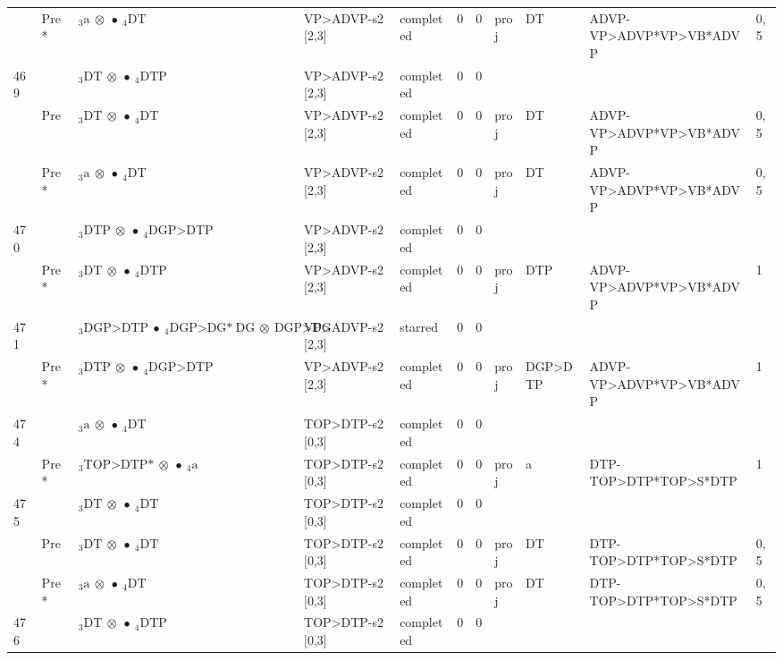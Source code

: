\documentclass[10pt]{article}
\begin{document}
\begin{longtable}[htbp]{lllllllllll}
 & Pre *& $ {}_3 \textrm{a} \  \otimes \  \bullet \ {}_{4} \textrm{DT} $ & VP>ADVP-s2 [2,3] & completed & 0 & 0 & proj & DT & ADVP-VP>ADVP*VP>VB*ADVP & 0,5 \\ 
469 & & $ {}_3 \textrm{DT} \  \otimes \  \bullet \ {}_{4} \textrm{DTP} $ & VP>ADVP-s2 [2,3] & completed & 0 & 0 & & & & \\ 
 & Pre & $ {}_3 \textrm{DT} \  \otimes \  \bullet \ {}_{4} \textrm{DT} $ & VP>ADVP-s2 [2,3] & completed & 0 & 0 & proj & DT & ADVP-VP>ADVP*VP>VB*ADVP & 0,5 \\ 
 & Pre *& $ {}_3 \textrm{a} \  \otimes \  \bullet \ {}_{4} \textrm{DT} $ & VP>ADVP-s2 [2,3] & completed & 0 & 0 & proj & DT & ADVP-VP>ADVP*VP>VB*ADVP & 0,5 \\ 
470 & & $ {}_3 \textrm{DTP} \  \otimes \  \bullet \ {}_{4} \textrm{DGP>DTP} $ & VP>ADVP-s2 [2,3] & completed & 0 & 0 & & & & \\ 
 & Pre *& $ {}_3 \textrm{DT} \  \otimes \  \bullet \ {}_{4} \textrm{DTP} $ & VP>ADVP-s2 [2,3] & completed & 0 & 0 & proj & DTP & ADVP-VP>ADVP*VP>VB*ADVP & 1 \\ 
471 & & $ {}_3 \textrm{DGP>DTP} \  \bullet \ {}_{4} \textrm{DGP>DG*} \ \textrm{DG} \  \otimes \ \textrm{DGP>DG} $ & VP>ADVP-s2 [2,3] & starred & 0 & 0 & & & & \\ 
 & Pre *& $ {}_3 \textrm{DTP} \  \otimes \  \bullet \ {}_{4} \textrm{DGP>DTP} $ & VP>ADVP-s2 [2,3] & completed & 0 & 0 & proj & DGP>DTP & ADVP-VP>ADVP*VP>VB*ADVP & 1 \\ 
474 & & $ {}_3 \textrm{a} \  \otimes \  \bullet \ {}_{4} \textrm{DT} $ & TOP>DTP-s2 [0,3] & completed & 0 & 0 & & & & \\ 
 & Pre *& $ {}_3 \textrm{TOP>DTP*} \  \otimes \  \bullet \ {}_{4} \textrm{a} $ & TOP>DTP-s2 [0,3] & completed & 0 & 0 & proj & a & DTP-TOP>DTP*TOP>S*DTP & 1 \\ 
475 & & $ {}_3 \textrm{DT} \  \otimes \  \bullet \ {}_{4} \textrm{DT} $ & TOP>DTP-s2 [0,3] & completed & 0 & 0 & & & & \\ 
 & Pre & $ {}_3 \textrm{DT} \  \otimes \  \bullet \ {}_{4} \textrm{DT} $ & TOP>DTP-s2 [0,3] & completed & 0 & 0 & proj & DT & DTP-TOP>DTP*TOP>S*DTP & 0,5 \\ 
 & Pre *& $ {}_3 \textrm{a} \  \otimes \  \bullet \ {}_{4} \textrm{DT} $ & TOP>DTP-s2 [0,3] & completed & 0 & 0 & proj & DT & DTP-TOP>DTP*TOP>S*DTP & 0,5 \\ 
476 & & $ {}_3 \textrm{DT} \  \otimes \  \bullet \ {}_{4} \textrm{DTP} $ & TOP>DTP-s2 [0,3] & completed & 0 & 0 & & & & \\ 

\end{longtable}
\end{document}
